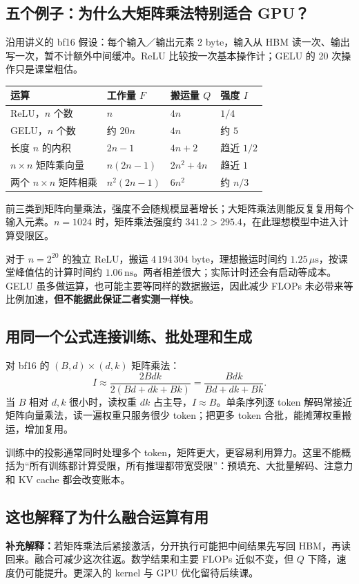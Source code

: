 \documentclass[UTF8,fontset=fandol,zihao=-4,a4paper]{ctexart}
\begin{document}
\subsection{五个例子：为什么大矩阵乘法特别适合 GPU？}
沿用讲义的 bf16 假设：每个输入／输出元素 2 byte，输入从 HBM 读一次、输出写一次，暂不计额外中间缓冲。ReLU 比较按一次基本操作计；GELU 的 20 次操作只是课堂粗估。
\par\noindent\begin{tabularx}{\linewidth}{@{}P{34mm}P{29mm}P{31mm}Y@{}}
\toprule
运算 & 工作量 $F$ & 搬运量 $Q$ & 强度 $I$\\
\midrule
ReLU，$n$ 个数 & $n$ & $4n$ & $1/4$\\
GELU，$n$ 个数 & 约 $20n$ & $4n$ & 约 $5$\\
长度 $n$ 的内积 & $2n-1$ & $4n+2$ & 趋近 $1/2$\\
$n\times n$ 矩阵乘向量 & $n(2n-1)$ & $2n^2+4n$ & 趋近 $1$\\
两个 $n\times n$ 矩阵相乘 & $n^2(2n-1)$ & $6n^2$ & 约 $n/3$\\
\bottomrule
\end{tabularx}
前三类到矩阵向量乘法，强度不会随规模显著增长；大矩阵乘法则能反复复用每个输入元素。$n=1024$ 时，矩阵乘法强度约 $341.2>295.4$，在此理想模型中进入计算受限区。

对于 $n=2^{20}$ 的独立 ReLU，搬运 $4\,194\,304$ byte，理想搬运时间约 $1.25\,\mu\mathrm{s}$，按课堂峰值估的计算时间约 $1.06\,\mathrm{ns}$。两者相差很大；实际计时还会有启动等成本。GELU 虽多做运算，也可能主要等同样的数据搬运，因此减少 FLOPs 未必带来等比例加速，\textbf{但不能据此保证二者实测一样快}。

\subsection{用同一个公式连接训练、批处理和生成}
对 bf16 的 $(B,d)\times(d,k)$ 矩阵乘法：
\[
I\approx\frac{2Bdk}{2(Bd+dk+Bk)}
=\frac{Bdk}{Bd+dk+Bk}.
\]
当 $B$ 相对 $d,k$ 很小时，读权重 $dk$ 占主导，$I\approx B$。单条序列逐 token 解码常接近矩阵向量乘法，读一遍权重只服务很少 token；把更多 token 合批，能摊薄权重搬运，增加复用。

训练中的投影通常同时处理多个 token，矩阵更大，更容易利用算力。这里不能概括为“所有训练都计算受限，所有推理都带宽受限”：预填充、大批量解码、注意力和 KV cache 都会改变账本。

\subsection{这也解释了为什么融合运算有用}
\textbf{补充解释：}若矩阵乘法后紧接激活，分开执行可能把中间结果先写回 HBM，再读回来。融合可减少这次往返。数学结果和主要 FLOPs 近似不变，但 $Q$ 下降，速度仍可能提升。更深入的 kernel 与 GPU 优化留待后续课。
\end{document}
